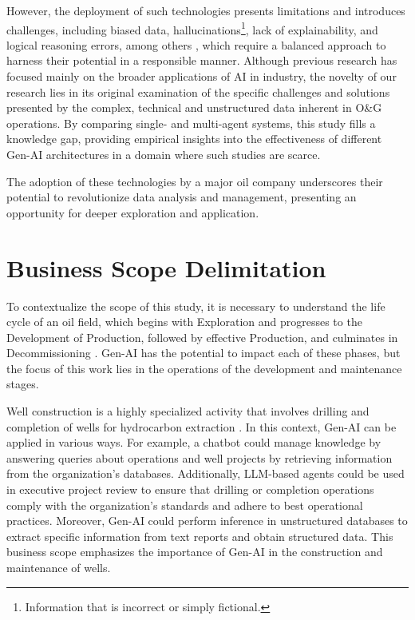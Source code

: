     However, the deployment of such technologies presents limitations and introduces challenges, including biased data, hallucinations\footnote{Information that is incorrect or simply fictional.}, lack of explainability, and logical reasoning errors, among others \citep{Hadi2023}, which require a balanced approach to harness their potential in a responsible manner.    
    Although previous research has focused mainly on the broader applications of AI in industry, the novelty of our research lies in its original examination of the specific challenges and solutions presented by the complex, technical and unstructured data inherent in O\&G operations. 
    By comparing single- and multi-agent systems, this study fills a knowledge gap, providing empirical insights into the effectiveness of different Gen-AI architectures in a domain where such studies are scarce. 
    
    The adoption of these technologies by a major oil company underscores their potential to revolutionize data analysis and management, presenting an opportunity for deeper exploration and application.

\section{Business Scope Delimitation}

    To contextualize the scope of this study, it is necessary to understand the life cycle of an oil field, which begins with Exploration and progresses to the Development of Production, followed by effective Production, and culminates in Decommissioning \citep{Badiru2016}. Gen-AI has the potential to impact each of these phases, but the focus of this work lies in the operations of the development and maintenance stages.
            
    Well construction is a highly specialized activity that involves drilling and completion of wells for hydrocarbon extraction \citep{Thomas2004}. In this context, Gen-AI can be applied in various ways. 
    For example, a chatbot could manage knowledge by answering queries about operations and well projects by retrieving information from the organization's databases. 
    Additionally, LLM-based agents could be used in executive project review to ensure that drilling or completion operations comply with the organization's standards and adhere to best operational practices. 
    Moreover, Gen-AI could perform inference in unstructured databases to extract specific information from text reports and obtain structured data. This business scope emphasizes the importance of Gen-AI in the construction and maintenance of wells.

